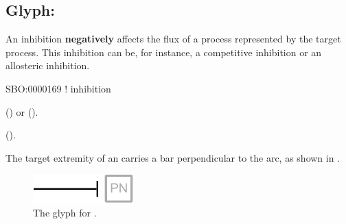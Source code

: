 \subsection{Glyph: }
\label{sec:inhibition}

An inhibition \textbf{negatively} affects the flux of a process represented by the target process.
This inhibition can be, for instance, a competitive inhibition or an allosteric inhibition.

\begin{glyphDescription}

\glyphSboTerm
SBO:0000169 ! inhibition

\glyphOrigin
{}  () or   ().

\glyphTarget
{}  ().

\glyphSymbol
The target extremity of an  carries a bar perpendicular to the arc, as shown in .

\end{glyphDescription}

\begin{figure}[H]
  \centering
  \includegraphics{images/inhibition}
  \caption{The \PD glyph for .}
  \label{fig:inhibition}
\end{figure}
